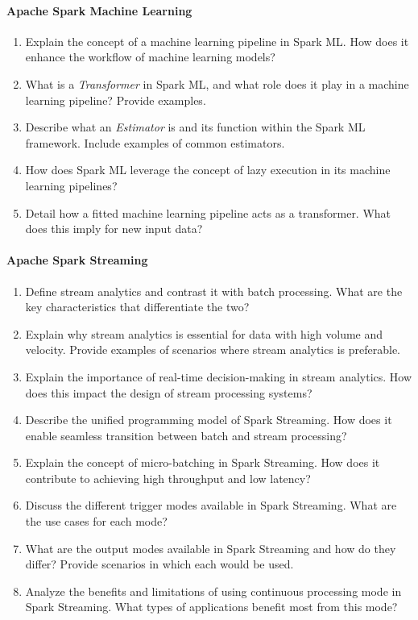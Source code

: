 \paragraph*{Apache Spark Machine Learning}
\begin{enumerate}
    \item Explain the concept of a machine learning pipeline in Spark ML. How does it enhance the workflow of machine learning models?
    \item What is a \emph{Transformer} in Spark ML, and what role does it play in a machine learning pipeline? Provide examples.
    \item Describe what an \emph{Estimator} is and its function within the Spark ML framework. Include examples of common estimators.
	\item How does Spark ML leverage the concept of lazy execution in its machine learning pipelines?
    \item Detail how a fitted machine learning pipeline acts as a transformer. What does this imply for new input data?
\end{enumerate}
\paragraph*{Apache Spark Streaming}
\begin{enumerate}
	\item Define stream analytics and contrast it with batch processing. What are the key characteristics that differentiate the two?
	\item Explain why stream analytics is essential for data with high volume and velocity. Provide examples of scenarios where stream analytics is preferable.
	\item Explain the importance of real-time decision-making in stream analytics. How does this impact the design of stream processing systems?
	\item Describe the unified programming model of Spark Streaming. How does it enable seamless transition between batch and stream processing?
	\item Explain the concept of micro-batching in Spark Streaming. How does it contribute to achieving high throughput and low latency?
	\item Discuss the different trigger modes available in Spark Streaming. What are the use cases for each mode?
	\item What are the output modes available in Spark Streaming and how do they differ? Provide scenarios in which each would be used.
	\item Analyze the benefits and limitations of using continuous processing mode in Spark Streaming. What types of applications benefit most from this mode?
\end{enumerate}
